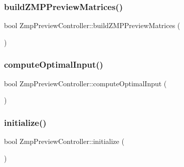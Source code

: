 \hypertarget{classZmpPreviewController_aadf1b7cba1ac0a1e6ec3bc8e0b761d02}{}\label{classZmpPreviewController_aadf1b7cba1ac0a1e6ec3bc8e0b761d02} 
\subsubsection{\texorpdfstring{build\+Z\+M\+P\+Preview\+Matrices()}{buildZMPPreviewMatrices()}}
{\footnotesize\ttfamily bool Zmp\+Preview\+Controller\+::build\+Z\+M\+P\+Preview\+Matrices (\begin{DoxyParamCaption}{ }\end{DoxyParamCaption})}

\hypertarget{classZmpPreviewController_a321140d8b3d99cf82687c444344c161d}{}\label{classZmpPreviewController_a321140d8b3d99cf82687c444344c161d} 
\subsubsection{\texorpdfstring{compute\+Optimal\+Input()}{computeOptimalInput()}}
{\footnotesize\ttfamily bool Zmp\+Preview\+Controller\+::compute\+Optimal\+Input (\begin{DoxyParamCaption}{ }\end{DoxyParamCaption})}

\hypertarget{classZmpPreviewController_ac28287e01187bff2cea5a68292d936bd}{}\label{classZmpPreviewController_ac28287e01187bff2cea5a68292d936bd} 
\subsubsection{\texorpdfstring{initialize()}{initialize()}}
{\footnotesize\ttfamily bool Zmp\+Preview\+Controller\+::initialize (\begin{DoxyParamCaption}{ }\end{DoxyParamCaption})}

\hypertarget{classZmpPreviewController_a65905572c73752a3ff46c0435c9794a0}{}\label{classZmpPreviewController_a65905572c73752a3ff46c0435c9794a0} 
